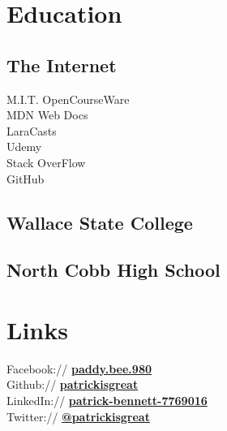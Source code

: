 \documentclass[]{pb-resume}
\begin{document}
%
%
\lastupdated

%
%

%
%

\begin{minipage}[t]{0.33\textwidth} 


\section{Education} 

\subsection{The Internet}
M.I.T. OpenCourseWare \\
MDN Web Docs \\
LaraCasts \\
Udemy \\
Stack OverFlow \\
GitHub \\

\sectionsep

\subsection{Wallace State College}
\sectionsep

\subsection{North Cobb High School}
\sectionsep


\section{Links} 
Facebook:// \href{https://facebook/paddy.bee.980}{\bf paddy.bee.980} \\
Github:// \href{https://github.com/patrickisgreat}{\bf patrickisgreat} \\
LinkedIn://  \href{https://www.linkedin.com/in/patrick-bennett-7769016}{\bf patrick-bennett-7769016} \\
Twitter://  \href{https://twitter.com/patrickisgreat}{\bf @patrickisgreat} \\



\end{minipage}
\end{document}

